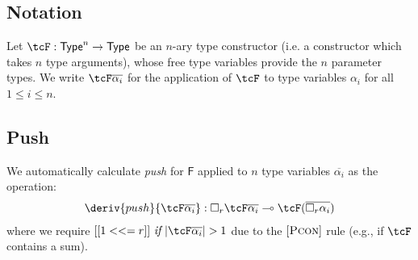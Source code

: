 %
\subsection{Notation}
Let $\tcF : \mathsf{Type}^n \rightarrow \mathsf{Type}$
be an $n$-ary type constructor (i.e. a constructor which takes $n$ type arguments), whose free type variables
provide the $n$ parameter types. We write $\tcF \overline{\alpha_i}$ for
the application of $\tcF$ to
type variables $\alpha_i$ for all $1 \leq i \leq n$.

%
\subsection{Push}
We automatically
calculate \emph{push} for $\mathsf{F}$
applied to $n$ type variables
$\overline{\alpha_i}$
as the operation:
%
\begin{align*}
\deriv{push}{\tcF \overline{\alpha_i}} : \Box_{r} \tcF \overline{\alpha_i}
  \multimap  \tcF  (\overline{\Box_{r} \alpha_i})
 \end{align*}
where we require $[[ 1 <<= r ]]\ \textit{if}\ |\tcF \overline{\alpha_i}| > 1$
due to the $[\textsc{Pcon}]$ rule (e.g., if $\tcF$ contains a sum).


